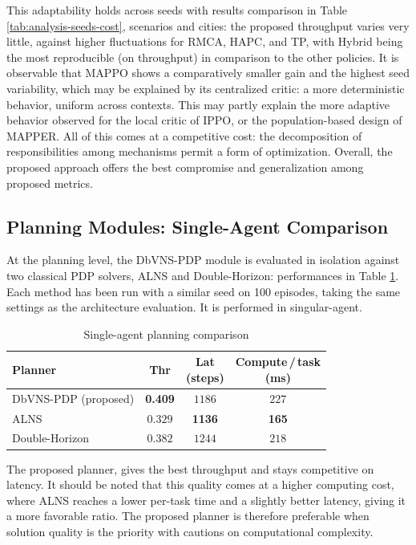 \documentclass[sigconf]{acmart}
\newcommand{\best}[1]{\textbf{\color{black}#1}}
\begin{document}
This adaptability holds across seeds with results comparison in Table \ref{tab:analysis-seeds-cost}, scenarios and cities: the proposed throughput varies very little, against higher fluctuations for RMCA, HAPC, and TP, with Hybrid being the most reproducible (on throughput) in comparison to the other policies. It is observable that MAPPO shows a comparatively smaller gain and the highest seed variability, which may be explained by its centralized critic: a more deterministic behavior, uniform across contexts. This may partly explain the more adaptive behavior observed for the local critic of IPPO, or the population-based design of MAPPER. All of this comes at a competitive cost: the decomposition of responsibilities among mechanisms permit a form of optimization. Overall, the proposed approach offers the best compromise and generalization among proposed metrics.

\subsection{Planning Modules: Single-Agent Comparison}

At the planning level, the DbVNS-PDP module is evaluated in isolation against two classical PDP solvers, ALNS and Double-Horizon: performances in Table \ref{tab:analysis-planning}. Each method has been run with a similar seed on 100 episodes, taking the same settings as the architecture evaluation. It is performed in singular-agent.

\begin{table}[!htbp]
\centering
\caption{Single-agent planning comparison}
\label{tab:analysis-planning}
\footnotesize
\renewcommand{\arraystretch}{1.2}
\begin{tabular*}{\columnwidth}{@{\extracolsep{\fill}}lccc@{}}
\toprule
\textbf{Planner}
  & \textbf{Thr}
  & \shortstack{\textbf{Lat}\\(steps)}
  & \shortstack{\textbf{Compute\,/\,task}\\(ms)} \\
\midrule
DbVNS-PDP (proposed) & \best{0.409} & $1186$       & $227$ \\
ALNS                 & $0.329$      & \best{1136}  & \best{165} \\
Double-Horizon       & $0.382$      & $1244$       & $218$ \\
\bottomrule
\end{tabular*}
\end{table}

The proposed planner, gives the best throughput and stays competitive on latency. It should be noted that this quality comes at a higher computing cost, where ALNS reaches a lower per-task time and a slightly better latency, giving it a more favorable ratio. The proposed planner is therefore preferable when solution quality is the priority with cautions on computational complexity.
\end{document}
